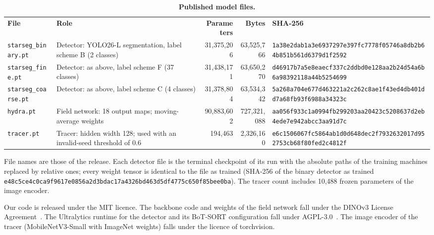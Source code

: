 \begin{table}[!htbp]
\centering
\caption{\textbf{Published model files.}}
\label{tab:checksums}
{\footnotesize
\setlength{\tabcolsep}{3.5pt}
\begin{tabular}{|l|>{\raggedright\arraybackslash}p{1.65in}|r|r|>{\raggedright\arraybackslash}p{2.3in}|}
\hline
\textbf{File} & \textbf{Role} & \textbf{Parameters} & \textbf{Bytes} & \textbf{SHA-256} \\ \thickhline
\texttt{starseg\_binary.pt} & Detector: YOLO26-L segmentation, label scheme B (2 classes) & 31,375,206 & 63,525,766 & \texttt{1a38e2dab1a3e6937297e397fc7778f0\allowbreak 5746a8db2b64b851b561d6379d1f2592} \\ \hline
\texttt{starseg\_fine.pt} & Detector: as above, label scheme F (37 classes) & 31,438,171 & 63,650,270 & \texttt{d46917b7a5e8eaecf337c2ddbd0e128a\allowbreak a2b24d54a6b6a98392118a44b5254699} \\ \hline
\texttt{starseg\_coarse.pt} & Detector: as above, label scheme C (4 classes) & 31,378,804 & 63,534,342 & \texttt{5a268a704e677d463221a2c262c8ae1f\allowbreak 43ed4db401dd7a68fb93f6988a34323c} \\ \hline
\texttt{hydra.pt} & Field network: 18 output maps; moving-average weights & 90,883,602 & 727,321,088 & \texttt{aa056f933c1a0994fb299203aa20423c\allowbreak 5208637d2eb4ede7e942abcc3aa91d7c} \\ \hline
\texttt{tracer.pt} & Tracer: hidden width 128; used with an invalid-seed threshold of 0.6 & 194,463 & 2,326,160 & \texttt{e6c1506067fc5864ab1d0d648dec2f79\allowbreak 32632017d952753cb68f80fed2c4812f} \\ \hline
\end{tabular}
}
\begin{flushleft}\small
File names are those of the release.
Each detector file is the terminal checkpoint of its run with the absolute paths of the training machines replaced by relative ones; every weight tensor is identical to the file as trained (SHA-256 of the binary detector as trained \texttt{e48c5ce4c0ca9f9617e0856a2d3bdac1\allowbreak 7a4326bd463d5df4775c650f85bee0ba}).
The tracer count includes 10,488 frozen parameters of the image encoder.
\end{flushleft}
\end{table}

Our code is released under the MIT licence.
The backbone code and weights of the field network fall under the DINOv3 License Agreement~\cite{simeoni2025dinov3}.
The Ultralytics runtime for the detector and its BoT-SORT configuration fall under AGPL-3.0~\cite{jocher2026ultralytics}.
The image encoder of the tracer (MobileNetV3-Small with ImageNet weights) falls under the licence of torchvision.

